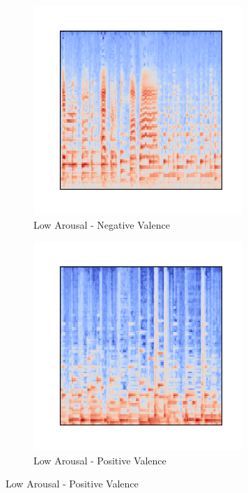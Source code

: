 \documentclass[runningheads]{llncs}
\begin{document}
\begin{figure}
\centering
	\begin{subfigure}[t]{.4\textwidth}
         \centering
         \includegraphics[scale = 0.4]{img/Mel-0.png}
         \caption{Low Arousal - Negative Valence}
	\end{subfigure}
	\quad
	\begin{subfigure}[t]{.4\textwidth}
		\centering
        \includegraphics[scale = 0.4]{img/Mel-1.png}
        \caption{Low Arousal - Positive Valence}
	\end{subfigure}
	

\end{figure}
\end{document}
